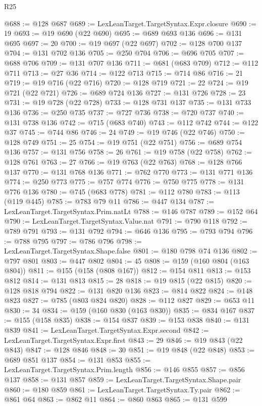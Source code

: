 \begin{lexlean}{R25}
\begin{coremodule}
{{{{{{{{{{{{{{{{{{{{{{{{{{{{{{{{{{{{{{{{{{{{{{{{{{{{{{{{{{{{{{{{{{{{{{{{{{{{{{{{{{{{{{{{{{{{{{{{{{{{{{{{{{{{{{{{{{{{{{{{{{{{{{{{{{{{{{{{{{{{{{{{{{{{{{{{{{{{{{{{{{{{{{{{{{{{{{{{{{{{{{{{{{{{{{{{{{{{{{{@688 := @128 @687
@689 := LexLeanTarget.TargetSyntax.Expr.closure
@690 := 19
@693 := @19 @690 (@22 @690)
@695 := @689 @693 @136
@696 := @131 @695
@697 := 20
@700 := @19 @697 (@22 @697)
@702 := @128 @700 @137
@704 := @131 @702 @136
@705 := @250 @704
@706 := @696 @705
@707 := @688 @706
@709 := @131 @707 @136
@711 := @681 (@683 @709)
@712 := @112 @711
@713 := @27 @36
@714 := @122 @713
@715 := @714 @86
@716 := 21
@719 := @19 @716 (@22 @716)
@720 := @128 @719
@721 := 22
@724 := @19 @721 (@22 @721)
@726 := @689 @724 @136
@727 := @131 @726
@728 := 23
@731 := @19 @728 (@22 @728)
@733 := @128 @731 @137
@735 := @131 @733 @136
@736 := @250 @735
@737 := @727 @736
@738 := @720 @737
@740 := @131 @738 @136
@742 := @715 (@683 @740)
@743 := @112 @742
@744 := @122 @37
@745 := @744 @86
@746 := 24
@749 := @19 @746 (@22 @746)
@750 := @128 @749
@751 := 25
@754 := @19 @751 (@22 @751)
@756 := @689 @754 @136
@757 := @131 @756
@758 := 26
@761 := @19 @758 (@22 @758)
@762 := @128 @761
@763 := 27
@766 := @19 @763 (@22 @763)
@768 := @128 @766 @137
@770 := @131 @768 @136
@771 := @762 @770
@773 := @131 @771 @136
@774 := @250 @773
@775 := @757 @774
@776 := @750 @775
@778 := @131 @776 @136
@780 := @745 (@683 @778)
@781 := @112 @780
@783 := @113 (@119 @445)
@785 := @783 @79 @11
@786 := @447 @134
@787 := LexLeanTarget.TargetSyntax.Prim.natLt
@788 := @146 @787
@789 := @152 @64
@790 := LexLeanTarget.TargetSyntax.Value.nat
@791 := @790 @118
@792 := @789 @791
@793 := @131 @792
@794 := @646 @136
@795 := @793 @794
@796 := @788 @795
@797 := @786 @796
@798 := LexLeanTarget.TargetSyntax.Shape.false
@801 := @180 @798 @74 @136
@802 := @797 @801
@803 := @447 @802
@804 := 45
@808 := @159 (@160 @804 (@163 @804))
@811 := @155 (@158 (@808 @167))
@812 := @154 @811
@813 := @153 @812
@814 := @131 @813
@815 := 28
@818 := @19 @815 (@22 @815)
@820 := @128 @818 @794
@822 := @131 @820 @136
@823 := @814 @822
@824 := @148 @823
@827 := @785 (@803 @824 @820)
@828 := @112 @827
@829 := @653 @11
@830 := 34
@834 := @159 (@160 @830 (@163 @830))
@835 := @834 @167
@837 := @155 (@158 @835)
@838 := @154 @837
@839 := @153 @838
@840 := @131 @839
@841 := LexLeanTarget.TargetSyntax.Expr.second
@842 := LexLeanTarget.TargetSyntax.Expr.first
@843 := 29
@846 := @19 @843 (@22 @843)
@847 := @128 @846
@848 := 30
@851 := @19 @848 (@22 @848)
@853 := @689 @851 @137
@854 := @131 @853
@855 := LexLeanTarget.TargetSyntax.Prim.length
@856 := @146 @855
@857 := @856 @137
@858 := @131 @857
@859 := LexLeanTarget.TargetSyntax.Shape.pair
@860 := @180 @859
@861 := LexLeanTarget.TargetSyntax.Ty.pair
@862 := @861 @64
@863 := @862 @11
@864 := @860 @863
@865 := @131 @599
}}}}}}}}}}}}}}}}}}}}}}}}}}}}}}}}}}}}}}}}}}}}}}}}}}}}}}}}}}}}}}}}}}}}}}}}}}}}}}}}}}}}}}}}}}}}}}}}}}}}}}}}}}}}}}}}}}}}}}}}}}}}}}}}}}}}}}}}}}}}}}}}}}}}}}}}}}}}}}}}}}}}}}}}}}}}}}}}}}}}}}}}}}}}}}}}}}}}}}}
\end{coremodule}
\end{lexlean}

